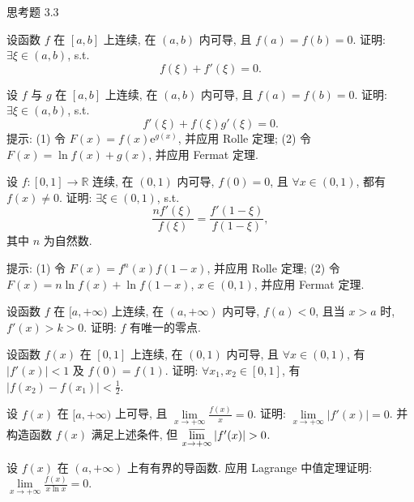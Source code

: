 \begin{exblock}{思考题 3.3}
  \item 设函数 $f$ 在 $[a,b]$ 上连续, 在 $(a,b)$ 内可导, 且 $f(a)=f(b)=0$. 证明: $\exists\xi\in(a,b)$, s.t.
  \[
  f(\xi)+f'(\xi)=0.
\]

  \item 设 $f$ 与 $g$ 在 $[a,b]$ 上连续, 在 $(a,b)$ 内可导, 且 $f(a)=f(b)=0$. 证明: $\exists\xi\in(a,b)$, s.t.
  \[
  f'(\xi)+f(\xi)g'(\xi)=0.
\]
  提示: (1) 令 $F(x)=f(x)\mathrm{e}^{g(x)}$, 并应用 Rolle 定理; (2) 令 $F(x)=\ln f(x)+g(x)$, 并应用 Fermat 定理.

  \item 设 $f:[0,1]\to\mathbb{R}$ 连续, 在 $(0,1)$ 内可导, $f(0)=0$, 且 $\forall x\in(0,1)$, 都有 $f(x)\neq0$. 证明: $\exists\xi\in(0,1)$, s.t.
  \[
  \frac{nf'(\xi)}{f(\xi)}=\frac{f'(1-\xi)}{f(1-\xi)},
\]
  其中 $n$ 为自然数.

  提示: (1) 令 $F(x)=f^{n}(x)f(1-x)$, 并应用 Rolle 定理; (2) 令 $F(x)=n\ln f(x)+\ln f(1-x)$, $x\in(0,1)$, 并应用 Fermat 定理.

  \item 设函数 $f$ 在 $[a,+\infty)$ 上连续, 在 $(a,+\infty)$ 内可导, $f(a)<0$, 且当 $x>a$ 时, $f'(x)>k>0$. 证明: $f$ 有唯一的零点.

  \item 设函数 $f(x)$ 在 $[0,1]$ 上连续, 在 $(0,1)$ 内可导, 且 $\forall x\in(0,1)$, 有 $|f'(x)|<1$ 及 $f(0)=f(1)$. 证明: $\forall x_1,x_2\in[0,1]$, 有 $|f(x_2)-f(x_1)|<\frac{1}{2}$.

  \item 设 $f(x)$ 在 $[a,+\infty)$ 上可导, 且 $\lim\limits_{x\to+\infty}\frac{f(x)}{x}=0$. 证明: $\lim\limits_{x\to+\infty}|f'(x)|=0$. 并构造函数 $f(x)$ 满足上述条件, 但 $\varlimsup\limits_{x\to+\infty}|f'(x)|>0$.

  \item 设 $f(x)$ 在 $(a,+\infty)$ 上有有界的导函数. 应用 Lagrange 中值定理证明: $\lim\limits_{x\to+\infty}\frac{f(x)}{x\ln x}=0$.
\end{exblock}
